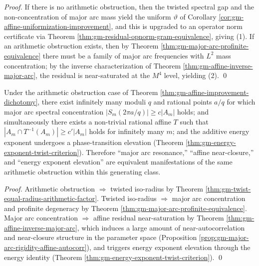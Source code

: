 \begin{proof}
If there is no arithmetic obstruction, then the twisted spectral gap and the non-concentration of major arc mass yield the uniform \(\vartheta\) of Corollary \ref{cor:gm-affine-uniformization-improvement}, and this is upgraded to an operator norm certificate via Theorem \ref{thm:gm-residual-opnorm-gram-equivalence}, giving (1).
If an arithmetic obstruction exists, then by Theorem \ref{thm:gm-major-arc-profinite-equivalence} there must be a family of major arc frequencies with \(L^2\) mass concentration; by the inverse characterization of Theorem \ref{thm:gm-affine-inverse-major-arc}, the residual is near-saturated at the \(M^4\) level, yielding (2). \qed
\end{proof}

\begin{proposition}\label{prop:gm-triple-complementarity}
Under the arithmetic obstruction case of Theorem \ref{thm:gm-affine-improvement-dichotomy}, there exist infinitely many moduli \(q\) and rational points \(a/q\) for which major arc spectral concentration
\(
|S_m(2\pi a/q)|\ge c|A_m|
\)
holds; and simultaneously there exists a non-trivial rational affine \(T\) such that
\(
|A_m\cap T^{-1}(A_m)|\ge c'|A_m|
\)
holds for infinitely many \(m\); and the additive energy exponent undergoes a phase-transition elevation (Theorem \ref{thm:gm-energy-exponent-twist-criterion}).
Therefore ``major arc resonance,'' ``affine near-closure,'' and ``energy exponent elevation'' are equivalent manifestations of the same arithmetic obstruction within this generating class.
\end{proposition}

\begin{proof}
Arithmetic obstruction \(\Rightarrow\) twisted iso-radius by Theorem \ref{thm:gm-twist-equal-radius-arithmetic-factor}.
Twisted iso-radius \(\Rightarrow\) major arc concentration and profinite degeneracy by Theorem \ref{thm:gm-major-arc-profinite-equivalence}.
Major arc concentration \(\Rightarrow\) affine residual near-saturation by Theorem \ref{thm:gm-affine-inverse-major-arc}, which induces a large amount of near-autocorrelation and near-closure structure in the parameter space (Proposition \ref{prop:gm-major-arc-rigidity-affine-autocorr}), and triggers energy exponent elevation through the energy identity (Theorem \ref{thm:gm-energy-exponent-twist-criterion}). \qed
\end{proof}

